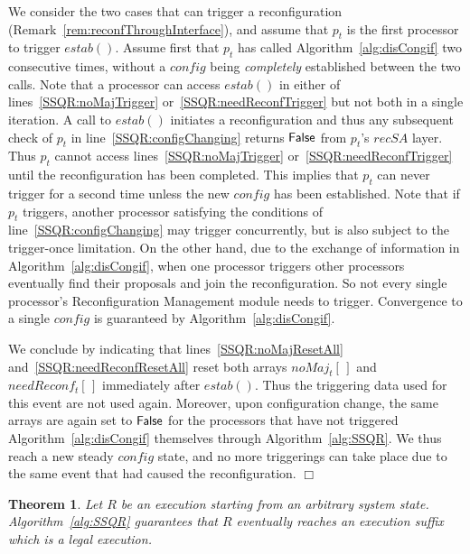 \documentclass[11pt]{article}
\newcommand{\configEstab}{estab}
\newtheorem{theorem}{Theorem}[section]
\newenvironment{proof}{\noindent{\bf Proof.}}{\hfill$\Box$}
\begin{document}
\begin{proof}
We consider the two cases that can trigger a reconfiguration (Remark~\ref{rem:reconfThroughInterface}), and assume that $p_t$ is the first processor to trigger $\configEstab()$.
Assume first that $p_t$ has called Algorithm~\ref{alg:disCongif} two consecutive times, without a $config$ being \emph{completely} established between the two calls. Note that a processor can access $\configEstab()$ in either of lines~\ref{SSQR:noMajTrigger} or~\ref{SSQR:needReconfTrigger} but not both in a single iteration.
A call to $\configEstab()$ initiates a reconfiguration and thus any subsequent check of $p_t$ in line~\ref{SSQR:configChanging} returns ${\sf False}$ from $p_t$'s $recSA$ layer. 
Thus $p_t$ cannot access lines~\ref{SSQR:noMajTrigger} or~\ref{SSQR:needReconfTrigger} until the reconfiguration has been completed. 
This implies that  $p_t$ can never trigger for a second time unless the new $config$ has been established.
Note that if $p_t$ triggers, another processor satisfying the conditions of line~\ref{SSQR:configChanging} may trigger concurrently, but is also subject to the trigger-once limitation.
On the other hand, due to the exchange of information in Algorithm~\ref{alg:disCongif}, when one processor triggers other processors eventually find their proposals and join the reconfiguration. 
So not every single processor's Reconfiguration Management module needs to trigger.
Convergence to a single $config$ is guaranteed by Algorithm~\ref{alg:disCongif}.


We conclude by indicating that lines~\ref{SSQR:noMajResetAll} and~\ref{SSQR:needReconfResetAll} reset both arrays $noMaj_t[\,]$ and $needReconf_t[\,]$ immediately after $\configEstab()$.
Thus the triggering data used for this event are not used again.
Moreover, upon configuration change, the same arrays are again set to $\sf False$ for the processors that have not triggered Algorithm~\ref{alg:disCongif}  themselves through Algorithm~\ref{alg:SSQR}.
We thus reach a new steady $config$ state, and no more triggerings can take place due to the same event that had caused the reconfiguration.
\end{proof}


\begin{theorem}
\label{thQ:corrUpperApp}
Let $R$ be an execution starting from an arbitrary system state. Algorithm~\ref{alg:SSQR} guarantees that $R$ eventually reaches an execution suffix which is a legal execution.
\end{theorem}
\end{document}
